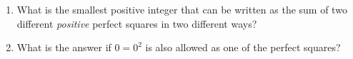 \begin{enumerate}
\item[(a)] What is the smallest positive integer that can be written as the sum of two different \emph{positive} perfect squares in two different ways?
\item[(b)] What is the answer if $0=0^2$ is also allowed as one of the perfect squares?
\end{enumerate}
